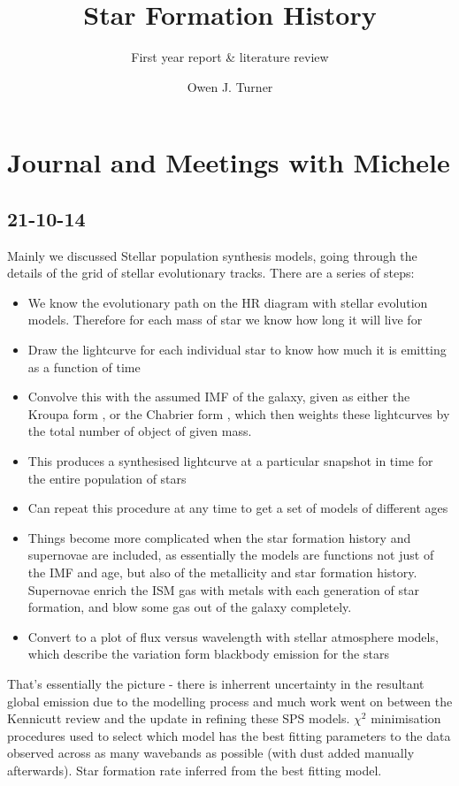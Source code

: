 \documentclass{literature}
\title{Star Formation History}
\subtitle{First year report \& literature review}
\author{Owen J. Turner}
\begin{document}
\background
\label{background}





\section{Journal and Meetings with Michele}\label{meetings}
\subsection{21-10-14}\label{meeting_1}
Mainly we discussed Stellar population synthesis models, going through the details of the grid of stellar evolutionary tracks. There are a series of steps: 
\begin{itemize}
\item We know the evolutionary path on the HR diagram with stellar evolution models. Therefore for each mass of star we know how long it will live for 
\item Draw the lightcurve for each individual star to know how much it is emitting as a function of time 
\item Convolve this with the assumed IMF of the galaxy, given as either the Kroupa form \citep{Kroupa1993}, or the Chabrier form \citep{Chabrier2003}, which then weights these lightcurves by the total number of object of given mass. 
\item This produces a synthesised lightcurve at a particular snapshot in time for the entire population of stars 
\item Can repeat this procedure at any time to get a set of models of different ages 
\item Things become more complicated when the star formation history and supernovae are included, as essentially the models are functions not just of the IMF and age, but also of the metallicity and star formation history. Supernovae enrich the ISM gas with metals with each generation of star formation, and blow some gas out of the galaxy completely. 
\item Convert to a plot of flux versus wavelength with stellar atmosphere models, which describe the variation form blackbody emission for the stars   
\end{itemize}
That's essentially the picture - there is inherrent uncertainty in the resultant global emission due to the modelling process and much work went on between the Kennicutt review and the update in refining these SPS models. $\chi ^{2}$ minimisation procedures used to select which model has the best fitting parameters to the data observed across as many wavebands as possible (with dust added manually afterwards). Star formation rate inferred from the best fitting model. \\
\end{document}
